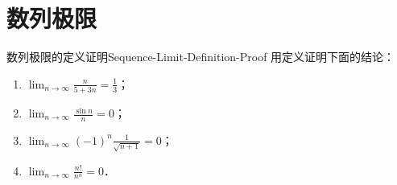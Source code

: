 \section{数列极限}

\begin{problem}{数列极限的定义证明}{Sequence-Limit-Definition-Proof}
    用定义证明下面的结论：
    \begin{enumerate}
        \item $\lim_{n\to\infty} \frac{n}{5 + 3n} = \frac{1}{3}$；
        \item $\lim_{n\to\infty} \frac{\sin n}{n} = 0$；
        \item $\lim_{n\to\infty} (-1)^n \frac{1}{\sqrt{n + 1}} = 0$；
        \item $\lim_{n\to\infty} \frac{n!}{n^n} = 0$．
    \end{enumerate}
\end{problem}

